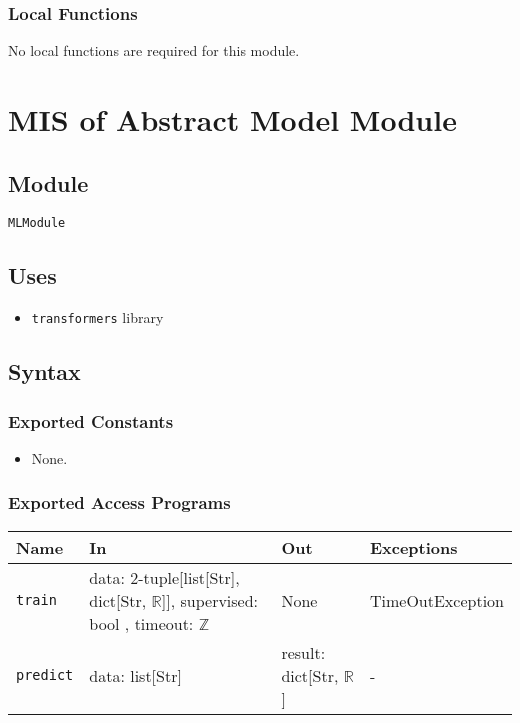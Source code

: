 \documentclass[12pt, titlepage]{article}
\begin{document}
\begin{itemize}
\subsubsection{Local Functions}
No local functions are required for this module.



\section{MIS of Abstract Model Module} \label{smMLModel} %

\subsection{Module}

\texttt{MLModule}

\subsection{Uses}

\begin{itemize}
    \item \texttt{transformers} library
\end{itemize}

\subsection{Syntax}

\subsubsection{Exported Constants}

\begin{itemize}
    \item None.
\end{itemize}

\subsubsection{Exported Access Programs}

\begin{center}
\begin{tabular}{p{5cm} p{3.5cm} p{3.5cm} p{2cm}}
\hline
\textbf{Name} & \textbf{In} & \textbf{Out} & \textbf{Exceptions} \\
\hline
\texttt{train} & data: 2-tuple[list[Str], dict[Str, $\mathbb{R}$]], supervised: bool , timeout: $\mathbb{Z}$  & None & TimeOutException \\
\texttt{predict} & data: list[Str] & result: dict[Str, $\mathbb{R}$] & - \\
\hline
\end{tabular}
\end{center}


\end{itemize}
\end{document}
